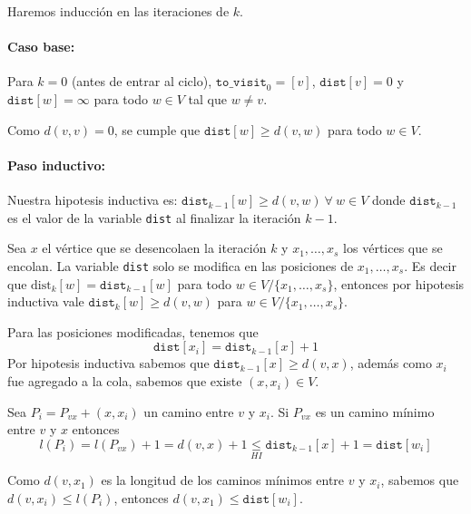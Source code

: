 \begin{demo}
  Haremos inducción en las iteraciones de \(k\).

  \paragraph{Caso base:} Para \(k=0\) (antes de entrar al ciclo), \(\texttt{to\_visit}_0 = [v]\), \(\texttt{dist}[v] = 0\) y \(\texttt{dist}[w] = \infty\) para todo \(w\in V\) tal que \(w\neq v\).

  Como \(d(v,v) = 0\), se cumple que \(\texttt{dist}[w] \geq d(v,w)\) para todo \(w\in V\).

  \paragraph{Paso inductivo:} Nuestra hipotesis inductiva es: \(\texttt{dist}_{k-1}[w] \geq d(v,w)~\forall~w\in V\) donde \(\texttt{dist}_{k-1}\) es el valor de la variable \texttt{dist} al finalizar la iteración \(k-1\).

  Sea \(x\) el vértice que se desencolaen la iteración \(k\) y \(x_1,\dots,x_s\) los vértices que se encolan. La variable \texttt{dist} solo se modifica en las posiciones de \(x_1,\dots,x_s\). Es decir que \(\text{dist}_k[w] = \texttt{dist}_{k-1}[w]\) para todo \(w\in V / \{x_1,\dots,x_s\}\), entonces por hipotesis inductiva vale \(\texttt{dist}_k[w] \geq d(v,w)\) para \(w\in V / \{x_1,\dots,x_s\}\).

  Para las posiciones modificadas, tenemos que \[\texttt{dist}[x_i] = \texttt{dist}_{k-1}[x] + 1\]Por hipotesis inductiva sabemos que \(\texttt{dist}_{k-1}[x] \geq d(v,x)\), además como \(x_i\) fue agregado a la cola, sabemos que existe \((x, x_i)\in V\).

  Sea \(P_{i} = P_{vx} + (x,x_i)\) un camino entre \(v\) y \(x_i\). Si \(P_{vx}\) es un camino mínimo entre \(v\) y \(x\) entonces \[l(P_{i}) = l(P_{vx}) + 1 = d(v,x) + 1 \underset{HI}{\leq} \texttt{dist}_{k-1}[x] + 1 = \texttt{dist}[w_i] \]
\end{demo}
\begin{demoPart}
  Como \(d(v,x_1)\) es la longitud de los caminos mínimos entre \(v\) y \(x_i\), sabemos que \(d(v, x_i) \leq l(P_i)\), entonces \(d(v,x_1) \leq \texttt{dist}[w_i]\).
\end{demoPart}

